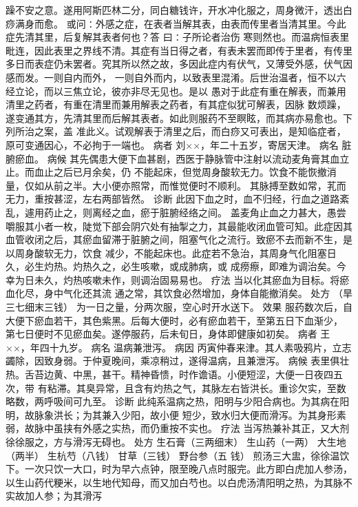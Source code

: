 \documentclass[a4paper,12pt,UTF8,twoside]{ctexbook}
\begin{document}
躁不安之意。遂用阿斯匹林二分，同白糖钱许，开水冲化服之，周身微汗，透出白痧满身而愈。 
或问∶外感之症，在表者当解其表，由表而传里者当清其里。今此症先清其里，后复解其表者何也？答 
曰∶子所论者治伤 
寒则然也。而温病恒表里毗连，因此表里之界线不清。其症有当日得之者，有表未罢而即传于里者，有传里 
多日而表症仍未罢者。究其所以然之故，多因此症内有伏气，又薄受外感，伏气因感而发。一则自内而外， 
一则自外而内，以致表里混淆。后世治温者，恒不以六经立论，而以三焦立论，彼亦非尽无见也。是以 
愚对于此症有重在解表，而兼用清里之药者，有重在清里而兼用解表之药者，有其症似犹可解表，因脉 
数烦躁，遂变通其方，先清其里而后解其表者。如此则服药不至瞑眩，而其病亦易愈也。下列所治之案，盖 
准此义。试观解表于清里之后，而白痧又可表出，是知临症者，原可变通因心，不必拘于一端也。 
病者 刘××，年二十五岁，寄居天津。 
病名 脏腑瘀血。 
病候 其先偶患大便下血甚剧，西医于静脉管中注射以流动麦角膏其血立止。而血止之后已月余矣，仍 
不能起床，但觉周身酸软无力。饮食不能恢撤消量，仅如从前之半。大小便亦照常，而惟觉便时不顺利。 
其脉搏至数如常，芤而无力，重按甚涩，左右两部皆然。 
诊断 此因下血之时，血不归经，行血之道路紊乱，遽用药止之，则离经之血，瘀于脏腑经络之间。 
盖麦角止血之力甚大，愚尝嚼服其小者一枚，陡觉下部会阴穴处有抽掣之力，其最能收闭血管可知。此症因其 
血管收闭之后，其瘀血留滞于脏腑之间，阻塞气化之流行。致瘀不去而新不生，是以周身酸软无力，饮食 
减少，不能起床也。此症若不急治，其周身气化阻塞日久，必生灼热。灼热久之，必生咳嗽，或成肺病，或 
成痨瘵，即难为调治矣。今幸为日未久，灼热咳嗽未作，则调治固易易也。 
疗法 当以化其瘀血为目标。将瘀血化尽，身中气化还其流 
通之常，其饮食必然增加，身体自能撤消矣。 
处方 （旱三七细末三钱） 为一日之量，分两次服，空心时开水送下。 
效果 服药数次后，自大便下瘀血若干，其色紫黑。后每大便时，必有瘀血若干，至第五日下血渐少， 
第七日便时不见瘀血矣。遂停服药，后未旬日，身体即健康如初矣。 
病者 王××，年四十九岁。 
病名 温病兼泄泻。 
病因 丙寅仲春来津。其人素吸鸦片，立志蠲除，因致身弱。于仲夏晚间，乘凉稍过，遂得温病，且兼泄泻。 
病候 表里俱壮热。舌苔边黄、中黑，甚干。精神昏愦，时作谵语。小便短涩，大便一日夜四五次，带 
有粘滞。其臭异常，且含有灼热之气，其脉左右皆洪长。重诊欠实，至数略数，两呼吸间可九至。 
诊断 此纯系温病之热，阳明与少阳合病也。为其病在阳明，故脉象洪长；为其兼入少阳，故小便 
短少，致水归大便而滑泻。为其身形素弱，故脉中虽挟有外感之实热，而仍重按不实也。 
疗法 当泻热兼补其正，又大剂徐徐服之，方与滑泻无碍也。 
处方 生石膏（三两细末） 生山药（一两） 大生地（两半） 生杭芍（八钱） 甘草（三钱） 野台参（五 
钱） 
煎汤三大盅，徐徐温饮下。一次只饮一大口，时为早六点钟，限至晚八点时服完。此方即白虎加人参汤， 
以生山药代粳米，以生地代知母，而又加白芍也。以白虎汤清阳明之热，为其脉不实故加人参；为其滑泻 
\end{document}

